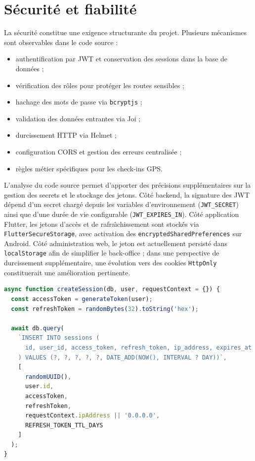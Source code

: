 ﻿\documentclass[12pt,a4paper]{report}
\begin{document}
\section{S\'ecurit\'e et fiabilit\'e}
La s\'ecurit\'e constitue une exigence structurante du projet. Plusieurs m\'ecanismes sont observables dans le code source :
\begin{itemize}
  \item authentification par JWT et conservation des sessions dans la base de donn\'ees ;
  \item v\'erification des r\^oles pour prot\'eger les routes sensibles ;
  \item hachage des mots de passe via \texttt{bcryptjs} ;
  \item validation des donn\'ees entrantes via Joi ;
  \item durcissement HTTP via Helmet ;
  \item configuration CORS et gestion des erreurs centralis\'ee ;
  \item r\`egles m\'etier sp\'ecifiques pour les check-ins GPS.
\end{itemize}

L'analyse du code source permet d'apporter des pr\'ecisions suppl\'ementaires sur la gestion des secrets et le stockage des jetons. C\^ot\'e backend, la signature des JWT d\'epend d'un secret charg\'e depuis les variables d'environnement (\texttt{JWT\_SECRET}) ainsi que d'une dur\'ee de vie configurable (\texttt{JWT\_EXPIRES\_IN}). C\^ot\'e application Flutter, les jetons d'acc\`es et de rafra\^\i chissement sont stock\'es via \texttt{FlutterSecureStorage}, avec activation des \texttt{encryptedSharedPreferences} sur Android. C\^ot\'e administration web, le jeton est actuellement persist\'e dans \texttt{localStorage} afin de simplifier le back-office ; dans une perspective de durcissement suppl\'ementaire, une \'evolution vers des cookies \texttt{HttpOnly} constituerait une am\'elioration pertinente.

\begin{lstlisting}[language=JavaScript,caption={Extrait illustratif de la cr\'eation d'une session}]
async function createSession(db, user, requestContext = {}) {
  const accessToken = generateToken(user);
  const refreshToken = randomBytes(32).toString('hex');

  await db.query(
    `INSERT INTO sessions (
      id, user_id, access_token, refresh_token, ip_address, expires_at
    ) VALUES (?, ?, ?, ?, ?, DATE_ADD(NOW(), INTERVAL ? DAY))`,
    [
      randomUUID(),
      user.id,
      accessToken,
      refreshToken,
      requestContext.ipAddress || '0.0.0.0',
      REFRESH_TOKEN_TTL_DAYS
    ]
  );
}
\end{lstlisting}
\end{document}
